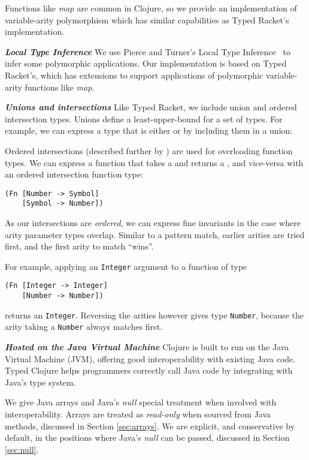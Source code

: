 \documentclass[preprint,10pt]{sigplanconf}
\newcommand\smallsection[1]{\bf \emph{#1}}
\begin{document}
Functions like \emph{map} are common in Clojure, so we provide an implementation
of variable-arity polymorphism which has similar capabilities as Typed Racket's
implementation.

{\smallsection {Local Type Inference}}
We use Pierce and Turner's Local Type Inference~\cite{PT00} to infer some polymorphic
applications. Our implementation is based on Typed Racket's, which has extensions
to support applications of polymorphic variable-arity functions like \emph{map}.

{\smallsection {Unions and intersections}}
Like Typed Racket, we include union and ordered intersection types. Unions define
a least-upper-bound for a set of types. For example, we can express a type that is
either \Number or \Symbol by including them in a union: {\Union {\Number} {\Symbol}}

Ordered intersections (described further by \citet{SA+12})
are used for overloading function types. We can express a function that takes
a \Number and returns a \Symbol, and vice-versa with an ordered intersection function type:

\begin{lstlisting}[label=lst:ordered]
(Fn [Number -> Symbol]
    [Symbol -> Number])
\end{lstlisting}

As our intersections are \emph{ordered}, we can express fine invariants in the
case where arity parameter types overlap. Similar to a pattern match, earlier arities 
are tried first, and the first arity to match ``wins''.

For example, applying an \lstinline|Integer| argument to a function of type

\begin{lstlisting}
(Fn [Integer -> Integer]
    [Number -> Number])
\end{lstlisting}

returns an \lstinline|Integer|. Reversing the arities however gives
type \lstinline|Number|, because the arity taking a \lstinline|Number|
always matches first.

{\smallsection {Hosted on the Java Virtual Machine}}
Clojure is built to run on the Java Virtual Machine (JVM),
offering good interoperability with existing Java code.
Typed Clojure helps programmers correctly call Java code
by integrating with Java's type system.

We give Java arrays and Java's \emph{null} special treatment
when involved with interoperability. Arrays are treated as \emph{read-only}
when sourced from Java methods, discussed in Section \ref{sec:arrays}.
We are explicit, and conservative by default, in the positions where
Java's \emph{null} can be passed, discussed in Section \ref{sec:null}.
\end{document}
